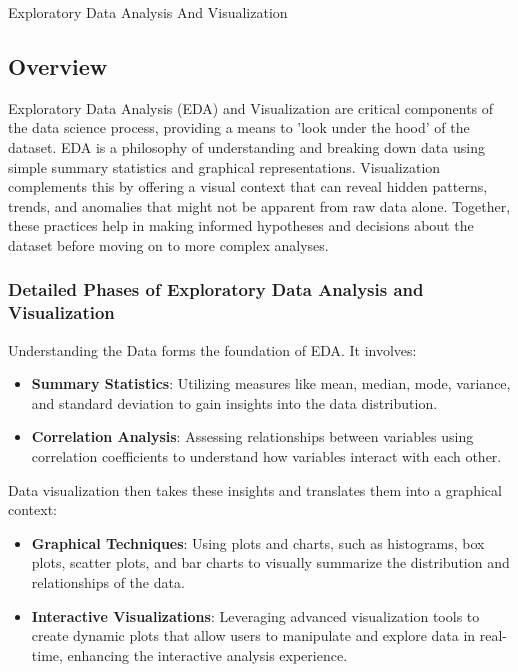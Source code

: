 \begin{notes}{Exploratory Data Analysis And Visualization}
    \subsection*{Overview}

    Exploratory Data Analysis (EDA) and Visualization are critical components of the data science process, providing a means to 'look under the hood' of the dataset. EDA is a philosophy of understanding 
    and breaking down data using simple summary statistics and graphical representations. Visualization complements this by offering a visual context that can reveal hidden patterns, trends, and anomalies 
    that might not be apparent from raw data alone. Together, these practices help in making informed hypotheses and decisions about the dataset before moving on to more complex analyses. \vspace*{1em}
    
    \subsubsection*{Detailed Phases of Exploratory Data Analysis and Visualization}
    
    Understanding the Data forms the foundation of EDA. It involves:
    \begin{itemize}
        \item \textbf{Summary Statistics}: Utilizing measures like mean, median, mode, variance, and standard deviation to gain insights into the data distribution.
        \item \textbf{Correlation Analysis}: Assessing relationships between variables using correlation coefficients to understand how variables interact with each other.
    \end{itemize}
    
    Data visualization then takes these insights and translates them into a graphical context:
    \begin{itemize}
        \item \textbf{Graphical Techniques}: Using plots and charts, such as histograms, box plots, scatter plots, and bar charts to visually summarize the distribution and relationships of the data.
        \item \textbf{Interactive Visualizations}: Leveraging advanced visualization tools to create dynamic plots that allow users to manipulate and explore data in real-time, enhancing the interactive analysis experience.
    \end{itemize}
    

\end{notes}
